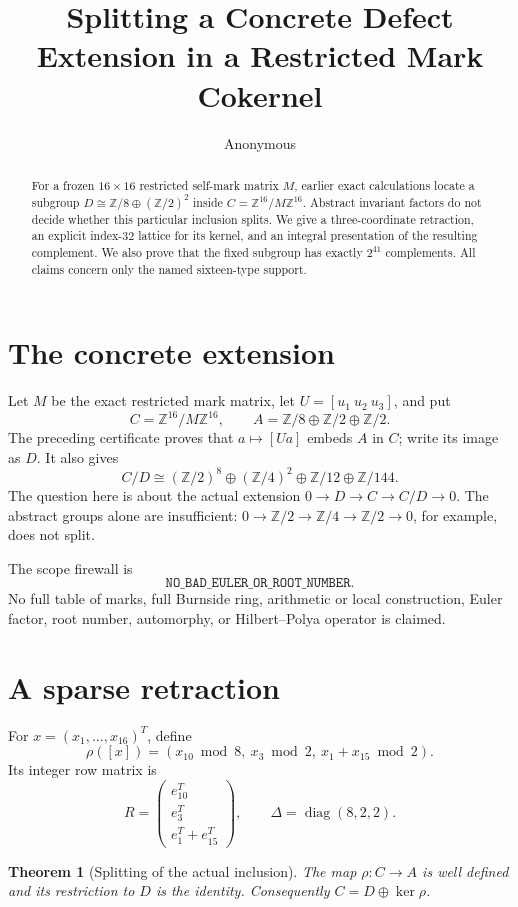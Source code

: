 \documentclass[10pt]{article}
\title{Splitting a Concrete Defect Extension in a Restricted Mark Cokernel}
\author{Anonymous}
\date{}
\newtheorem{theorem}{Theorem}
\newcommand{\Z}{\mathbb Z}
\newcommand{\diag}{\operatorname{diag}}
\begin{document}
\maketitle

\begin{abstract}
For a frozen $16\times16$ restricted self-mark matrix $M$, earlier exact
calculations locate a subgroup
$D\cong\mathbb Z/8\oplus(\mathbb Z/2)^2$ inside
$C=\mathbb Z^{16}/M\mathbb Z^{16}$.  Abstract invariant factors do not decide
whether this particular inclusion splits.  We give a three-coordinate
retraction, an explicit index-$32$ lattice for its kernel, and an integral
presentation of the resulting complement.  We also prove that the fixed
subgroup has exactly $2^{41}$ complements.  All claims concern only the named
sixteen-type support.
\end{abstract}

\section{The concrete extension}
Let $M$ be the exact restricted mark matrix, let
$U=[u_1\ u_2\ u_3]$, and put
\[
 C=\Z^{16}/M\Z^{16},\qquad
 A=\Z/8\oplus\Z/2\oplus\Z/2.
\]
The preceding certificate proves that $a\mapsto[Ua]$ embeds $A$ in $C$;
write its image as $D$.  It also gives
\[
 C/D\cong(\Z/2)^8\oplus(\Z/4)^2\oplus\Z/12\oplus\Z/144.
\]
The question here is about the actual extension
$0\to D\to C\to C/D\to0$.  The abstract groups alone are insufficient:
$0\to\Z/2\to\Z/4\to\Z/2\to0$, for example, does not split.

The scope firewall is
\[
\texttt{NO\_BAD\_EULER\_OR\_ROOT\_NUMBER}.
\]
No full table of marks, full Burnside ring, arithmetic or local construction,
Euler factor, root number, automorphy, or Hilbert--Polya operator is claimed.

\section{A sparse retraction}
For $x=(x_1,\ldots,x_{16})^T$, define
\[
 \rho([x])=(x_{10}\bmod8,\ x_3\bmod2,\ x_1+x_{15}\bmod2).
\]
Its integer row matrix is
\[
 R=\begin{pmatrix}
 e_{10}^T\\ e_3^T\\ e_1^T+e_{15}^T
 \end{pmatrix},\qquad \Delta=\diag(8,2,2).
\]

\begin{theorem}[Splitting of the actual inclusion]
The map $\rho:C\to A$ is well defined and its restriction to $D$ is the
identity.  Consequently $C=D\oplus\ker\rho$.
\end{theorem}
\end{document}

